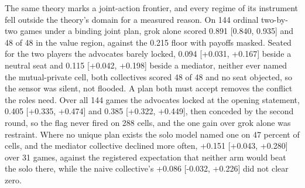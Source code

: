 The same theory marks a joint-action frontier, and every regime of its
instrument fell outside the theory's domain for a measured reason. On 144
ordinal two-by-two games under a binding joint plan, grok alone scored
0.891 [0.840, 0.935] and 48 of 48 in the value region, against the 0.215
floor with payoffs masked.
Seated for the two players the advocates barely locked, 0.094
[+0.031, +0.167] beside a neutral seat and 0.115 [+0.042, +0.198] beside a
mediator, neither ever named the mutual-private cell, both collectives
scored 48 of 48 and no seat objected, so the sensor was silent, not
flooded.
A plan both must accept removes the conflict the roles need. Over all
144 games the advocates locked at the opening statement, 0.405
[+0.335, +0.474] and 0.385 [+0.322, +0.449], then conceded by the second
round, so the flag never fired on 288 cells, and the one gain over grok
alone was restraint. Where no unique
plan exists the solo model named one on 47 percent of cells, and the
mediator collective declined more often, +0.151 [+0.043, +0.280] over 31
games, against the registered expectation that neither arm would beat the
solo there, while the naive collective's +0.086 [-0.032, +0.226] did not
clear zero.
